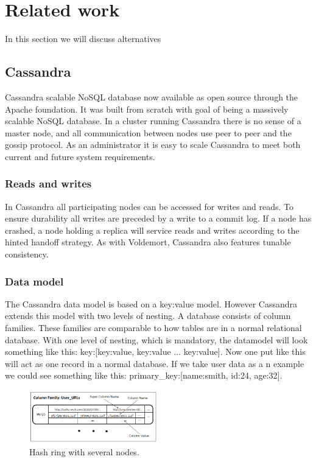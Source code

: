\section{Related work}
In this section we will discuss alternatives 

\subsection{Cassandra}
Cassandra scalable NoSQL database now available as open source through the Apache foundation. It was built from scratch with goal of being a massively scalable NoSQL database. In a cluster running Cassandra there is no sense of a master node, and all communication between nodes use peer to peer and the gossip protocol. As an administrator it is easy to scale Cassandra to meet both current and future system requirements. 

\subsubsection{Reads and writes}
In Cassandra all participating nodes can be accessed for writes and reads. To ensure durability all writes are preceded by a write to a commit log. If a node has crashed, a node holding a replica will service reads and writes according to the hinted handoff strategy. As with Voldemort, Cassandra also features tunable consistency. 

\subsubsection{Data model}
The Cassandra data model is based on a key:value model. However Cassandra extends this model with two levels of nesting. A database consists of column families. These families are comparable to how tables are in a normal relational database. With one level of nesting, which is mandatory, the datamodel will look something like this: key:[key:value, key:value ... key:value]. Now one put like this will act as one record in a normal database. If we take user data as a n example we could see something like this: primary_key:[name:smith, id:24, age:32].

\begin{figure}[h]
    \centering
    \includegraphics[width=0.5\textwidth]{resources/twitter-schema-user-urls.png}
    \caption{Hash ring with several nodes\cite{dynamo}.}
    \label{fig:hashring}
\end{figure}

